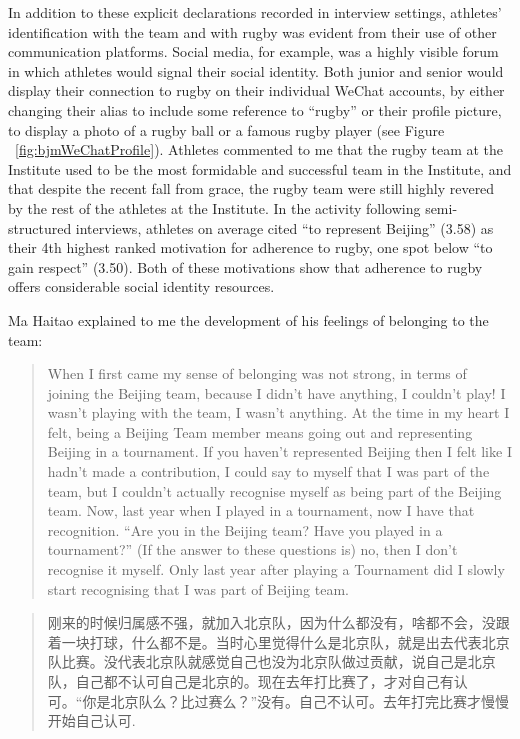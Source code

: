 \begin{CJK}{UTF8}{gbsn}
In addition to these explicit declarations recorded in interview settings, athletes' identification with the team and with rugby was evident from their use of other communication platforms.  Social media, for example, was a highly visible forum in which athletes would signal their social identity.  Both junior and senior would display their connection to rugby on their individual WeChat accounts, by either changing their alias to include some reference to ``rugby'' or their profile picture, to display a photo of a rugby ball or a famous rugby player (see Figure ~\ref{fig:bjmWeChatProfile}).  Athletes commented to me that the rugby team at the Institute used to be the most formidable and successful team in the Institute, and that despite the recent fall from grace, the rugby team were still highly revered by the rest of the athletes at the Institute.  In the activity following semi-structured interviews, athletes on average cited ``to represent Beijing'' (3.58) as their 4th highest ranked motivation for adherence to rugby, one spot below ``to gain respect'' (3.50).  Both of these motivations show that adherence to rugby offers considerable social identity resources.


Ma Haitao explained to me the development of his feelings of belonging to the team:

  \begin{quotation}
    When I first came my sense of belonging was not strong, in terms of joining the Beijing team, because I didn’t have anything, I couldn’t play! I wasn’t playing with the team, I wasn’t anything.  At the time in my heart I felt, being a Beijing Team member means going out and representing Beijing in a tournament.  If you haven’t represented Beijing then I felt like I hadn’t made a contribution, I could say to myself that I was part of the team, but I couldn’t actually recognise myself as being part of the Beijing team.  Now, last year when I played in a tournament, now I have that recognition. ``Are you in the Beijing team? Have you played in a tournament?'' (If the answer to these questions is) no, then I don’t recognise it myself.  Only last year after playing a Tournament did I slowly start recognising that I was part of Beijing team.
  \end{quotation}

  \begin{quotation}
    刚来的时候归属感不强，就加入北京队，因为什么都没有，啥都不会，没跟着一块打球，什么都不是。当时心里觉得什么是北京队，就是出去代表北京队比赛。没代表北京队就感觉自己也没为北京队做过贡献，说自己是北京队，自己都不认可自己是北京的。现在去年打比赛了，才对自己有认可。“你是北京队么？比过赛么？”没有。自己不认可。去年打完比赛才慢慢开始自己认可.
  \end{quotation}


\end{CJK}
